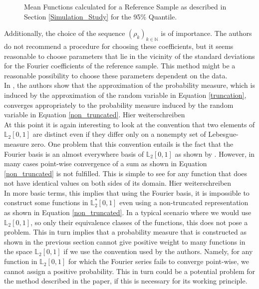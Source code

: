\documentclass[12pt, a4paper]{article}
\theoremstyle{MAstyle} \newtheorem{assumption}{Assumption}[section]
\theoremstyle{MAstyle} \newtheorem{definition}{Definition}[section]
\theoremstyle{MAstyle} \newtheorem{theorem}{Theorem}[section]
\begin{document}
			\begin{figure}[H]
				\caption{Mean Functions calculated for a Reference Sample as described in Section \ref{Simulation_Study} for the 95\% Quantile.}
				\label{mean_functions}
			\end{figure}
			
			
			Additionally, the choice of the sequence $(\rho_k)_{k \in \mathbb{N}}$ is of importance. The authors do not recommend a procedure for choosing these coefficients, but it seems reasonable to choose parameters that lie in the vicinity of the standard deviations for the Fourier coefficients of the reference sample. This method might be a reasonable possibility to choose these parameters dependent on the data.\\
			
			In \cite{bugni_goodness--fit_2009}, the authors show that the approximation of the probability measure, which is induced by the approximation of the random variable in Equation \ref{truncation}, converges appropriately to the probability measure induced by the random variable in Equation \ref{non_truncated}. {\color{red} Hier weiterschreiben}\\
			
			At this point it is again interesting to look at the convention that two elements of $\mathbb{L}_2[0,1]$ are distinct even if they differ only on a nonempty set of Lebesgue-measure zero. One problem that this convention entails is the fact that the Fourier basis is an almost everywhere basis of $\mathbb{L}_2[0,1]$ as shown by \cite{carleson_convergence_1966}. However, in many cases point-wise convergence of a sum as shown in Equation \ref{non_truncated} is not fulfilled. This is simple to see for any function that does not have identical values on both sides of its domain. {\color{red} Hier weiterschreiben}\\
			
			In more basic terms, this implies that using the Fourier basis, it is impossible to construct some functions in $\mathbb{L}_2^{*}[0,1]$ even using a non-truncated representation as shown in Equation \ref{non_truncated}.			
			In a typical scenario where we would use $\mathbb{L}_2[0,1]$, so only their equivalence classes of the functions, this does not pose a problem. 
			This in turn implies that a probability measure that is constructed as shown in the previous section cannot give positive weight to many functions in the space $\mathbb{L}_2[0,1]$ if we use the convention used by the authors. Namely, for any function in $\mathbb{L}_2[0,1]$ for which the Fourier series fails to converge point-wise, we cannot assign a positive probability. This in turn could be a potential problem for the method described in the paper, if this is necessary for its working principle.
			
\end{document}
